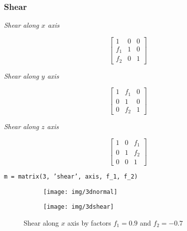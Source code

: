 \documentclass{scrartcl}
\begin{document}
\subsubsection*{Shear}
\noindent
\begin{center}
	\begin{minipage}{.3\linewidth}
		\begin{center}
			\textit{Shear along $x$ axis}
		\end{center}
		$$\left[ \begin{smallmatrix} 
		1 & 0 & 0\\
		f_1 & 1 & 0\\
		f_2 & 0 & 1
		\end{smallmatrix} \right]$$
	\end{minipage}%
	\begin{minipage}{.3\linewidth}
		\begin{center}
			\textit{Shear along $y$ axis}
		\end{center}
		$$\left[ \begin{smallmatrix} 
		1 & f_1 & 0\\
		0 & 1 & 0\\
		0 & f_2 & 1
		\end{smallmatrix} \right]$$
	\end{minipage}
	\begin{minipage}{.3\linewidth}
		\begin{center}
			\textit{Shear along $z$ axis}
		\end{center}
		$$\left[ \begin{smallmatrix}
		1 & 0 & f_1 \\
		0 & 1 & f_2\\
		0 & 0 & 1
		\end{smallmatrix} \right]$$
	\end{minipage}
\end{center}
\begin{center}
	\texttt{m = matrix(3, 'shear', axis, f\_1, f\_2)}
\end{center}
\begin{figure}[H]
	\centering
	\begin{subfigure}{.41\textwidth}
		\centering
		\texttt{[image: img/3dnormal]}
	\end{subfigure}%
	\begin{subfigure}{.41\textwidth}
		\centering
		\texttt{[image: img/3dshear]}
	\end{subfigure}
	\caption{Shear along $x$ axis by factors $f_1 = 0.9$ and $f_2 = -0.7$}
	\label{fig:rot}
\end{figure}
\end{document}
